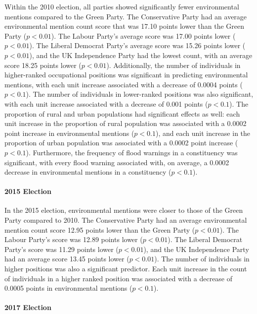 \documentclass[12pt,letterpaper]{article}
\begin{document}
Within the 2010 election, all parties showed significantly fewer environmental mentions compared to the Green Party. The Conservative Party had an average environmental mention count score that was 17.10 points lower than the Green Party ($p<0.01$). The Labour Party's average score was 17.00 points lower ($p<0.01$). The Liberal Democrat Party's average score was 15.26 points lower ($p<0.01$), and the UK Independence Party had the lowest count, with an average score 18.25 points lower ($p<0.01$). Additionally, the number of individuals in higher-ranked occupational positions was significant in predicting environmental mentions, with each unit increase associated with a decrease of 0.0004 points ($p<0.1$). The number of individuals in lower-ranked positions was also significant, with each unit increase associated with a decrease of 0.001 points ($p<0.1$). The proportion of rural and urban populations had significant effects as well: each unit increase in the proportion of rural population was associated with a 0.0002 point increase in environmental mentions ($p<0.1$), and each unit increase in the proportion of urban population was associated with a 0.0002 point increase ($p<0.1$). Furthermore, the frequency of flood warnings in a constituency was significant, with every flood warning associated with, on average, a 0.0002 decrease in environmental mentions in a constituency ($p < 0.1$).

\paragraph{2015 Election}

In the 2015 election, environmental mentions were closer to those of the Green Party compared to 2010. The Conservative Party had an average environmental mention count score 12.95 points lower than the Green Party ($p<0.01$). The Labour Party's score was 12.89 points lower ($p<0.01$). The Liberal Democrat Party's score was 11.29 points lower ($p<0.01$), and the UK Independence Party had an average score 13.45 points lower ($p<0.01$). The number of individuals in higher positions was also a significant predictor. Each unit increase in the count of individuals in a higher ranked position was associated with a decrease of 0.0005 points in environmental mentions ($p<0.1$).

\paragraph{2017 Election}
\end{document}
